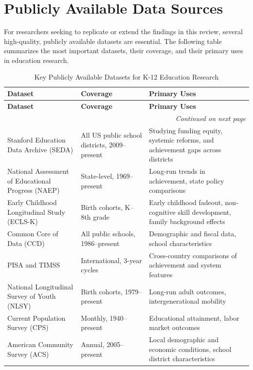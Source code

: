 \documentclass[12pt,letterpaper]{article}
\begin{document}
\section{Publicly Available Data Sources}

For researchers seeking to replicate or extend the findings in this review, several high-quality, publicly available datasets are essential. The following table summarizes the most important datasets, their coverage, and their primary uses in education research.

\begin{longtable}{p{4cm} p{3cm} p{7.5cm}}
\caption{Key Publicly Available Datasets for K-12 Education Research} \\
\toprule
\textbf{Dataset} & \textbf{Coverage} & \textbf{Primary Uses} \\
\midrule
\endfirsthead
\toprule
\textbf{Dataset} & \textbf{Coverage} & \textbf{Primary Uses} \\
\midrule
\endhead
\midrule
\multicolumn{3}{r}{\textit{Continued on next page}} \\
\endfoot
\bottomrule
\endlastfoot
Stanford Education Data Archive (SEDA) & All US public school districts, 2009--present & Studying funding equity, systemic reforms, and achievement gaps across districts \\
National Assessment of Educational Progress (NAEP) & State-level, 1969--present & Long-run trends in achievement, state policy comparisons \\
Early Childhood Longitudinal Study (ECLS-K) & Birth cohorts, K--8th grade & Early childhood fadeout, non-cognitive skill development, family background effects \\
Common Core of Data (CCD) & All public schools, 1986--present & Demographic and fiscal data, school characteristics \\
PISA and TIMSS & International, 3-year cycles & Cross-country comparisons of achievement and system features \\
National Longitudinal Survey of Youth (NLSY) & Birth cohorts, 1979--present & Long-run adult outcomes, intergenerational mobility \\
Current Population Survey (CPS) & Monthly, 1940--present & Educational attainment, labor market outcomes \\
American Community Survey (ACS) & Annual, 2005--present & Local demographic and economic conditions, school district characteristics \\
\end{longtable}
\end{document}
